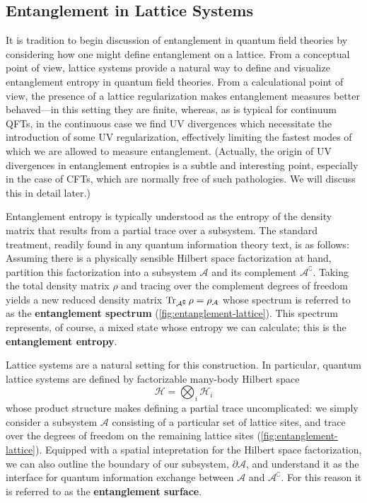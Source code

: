 \documentclass{report}
\begin{document}
\subsection{Entanglement in Lattice Systems} 
It is tradition to begin discussion of entanglement in quantum field theories 
by considering how one might define entanglement on a lattice.
From a conceptual point of view, lattice systems provide a natural way to define
and visualize entanglement entropy in quantum field theories. From a
calculational point of view, the presence of a lattice regularization makes
entanglement measures better behaved---in this setting they are finite, whereas,
as is typical for continuum QFTs, in the continuous case we find UV divergences 
which necessitate the introduction of some UV regularization, effectively limiting
the fastest modes of which we are allowed to measure entanglement. (Actually, 
the origin of UV divergences in entanglement entropies is a subtle and interesting 
point, especially in the case of CFTs, which are normally free of such pathologies.
We will discuss this in detail later.) 

Entanglement entropy is typically understood as the entropy of the density 
matrix that results from a partial trace over a subsystem. The standard treatment, 
readily found in any quantum information theory text, is as follows: Assuming 
there is a physically sensible Hilbert space factorization at hand, 
partition this factorization into a subsystem  $ \mathcal{A} $ and its complement $
\mathcal{A}^\complement $. Taking the total density matrix $ \rho $ and tracing
over the complement degrees of freedom yields a new reduced density matrix $
\Tr_{\mathcal{A}^\complement} \rho = \rho_\mathcal{A}$ whose spectrum is referred 
to as the \textbf{entanglement spectrum} (\cref{fig:entanglement-lattice}). This spectrum represents, of course,  
a mixed state whose entropy we can calculate; this is the \textbf{entanglement entropy}.

Lattice systems are a natural setting for this construction.
In particular, quantum lattice systems are defined by factorizable many-body 
Hilbert space
\begin{equation*}
	\mathcal{H} = \bigotimes_{i} \mathcal{H}_i
\end{equation*}
whose product structure makes defining a partial trace uncomplicated: we simply 
consider a subsystem $ \mathcal{A} $ consisting of a particular set of lattice sites, 
and trace over the degrees of freedom on the remaining lattice sites
(\cref{fig:entanglement-lattice}). Equipped with a spatial intepretation for the 
Hilbert space factorization, we can also outline the boundary of our subsystem,
$ \partial\mathcal{A} $, and understand it as the interface for quantum
information exchange between $ \mathcal{A} $ and $ \mathcal{A}^\complement $. 
For this reason it is referred to as the \textbf{entanglement surface}.
\end{document}
